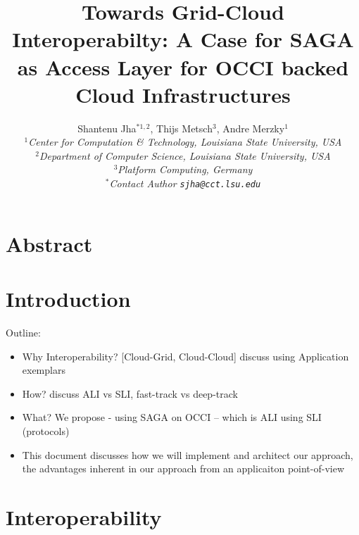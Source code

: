 \documentclass[10pt,conference,final,letterpaper,twoside,twocolumn,]{IEEEtran}
\begin{document}
\title{Towards Grid-Cloud Interoperabilty: A Case for SAGA as Access
  Layer for OCCI backed Cloud Infrastructures}

\author{Shantenu Jha$^{*1,2}$, Thijs Metsch$^{3}$, Andre Merzky$^{1}$\\
  \small{\emph{$^{1}$Center for Computation \& Technology, Louisiana State University, USA}}\\
  \small{\emph{$^{2}$Department of Computer Science, Louisiana State University, USA}}\\
  \small{\emph{$^{3}$Platform Computing, Germany}}\\
  \small{\emph{$^{*}$Contact Author \texttt{sjha@cct.lsu.edu}}}
  }


\maketitle

\section*{Abstract}



\section{Introduction}

Outline:
\begin{itemize}
\item Why Interoperability? [Cloud-Grid, Cloud-Cloud] discuss using
  Application exemplars
\item How? discuss ALI vs SLI, fast-track vs deep-track
\item What? We propose - using SAGA on OCCI -- which is ALI using SLI
  (protocols)
\item This document discusses how we will implement and architect our
  approach, the advantages inherent in our approach from an
  applicaiton point-of-view
\end{itemize}


\section{Interoperability}

\end{document}
